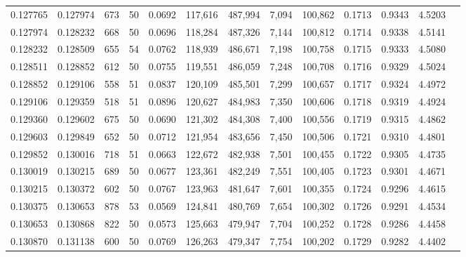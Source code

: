 \begin{tabular}{rrrrrrrrrrrrr}
0.127765 & 0.127974 &   673 &  50 &                                     0.0692 & 117,616 & 487,994 &   7,094 & 100,862 & 0.1713 & 0.9343 & 4.5203 \\
0.127974 & 0.128232 &   668 &  50 &                                     0.0696 & 118,284 & 487,326 &   7,144 & 100,812 & 0.1714 & 0.9338 & 4.5141 \\
0.128232 & 0.128509 &   655 &  54 &                                     0.0762 & 118,939 & 486,671 &   7,198 & 100,758 & 0.1715 & 0.9333 & 4.5080 \\
0.128511 & 0.128852 &   612 &  50 &                                     0.0755 & 119,551 & 486,059 &   7,248 & 100,708 & 0.1716 & 0.9329 & 4.5024 \\
0.128852 & 0.129106 &   558 &  51 &                                     0.0837 & 120,109 & 485,501 &   7,299 & 100,657 & 0.1717 & 0.9324 & 4.4972 \\
0.129106 & 0.129359 &   518 &  51 &                                     0.0896 & 120,627 & 484,983 &   7,350 & 100,606 & 0.1718 & 0.9319 & 4.4924 \\
0.129360 & 0.129602 &   675 &  50 &                                     0.0690 & 121,302 & 484,308 &   7,400 & 100,556 & 0.1719 & 0.9315 & 4.4862 \\
0.129603 & 0.129849 &   652 &  50 &                                     0.0712 & 121,954 & 483,656 &   7,450 & 100,506 & 0.1721 & 0.9310 & 4.4801 \\
0.129852 & 0.130016 &   718 &  51 &                                     0.0663 & 122,672 & 482,938 &   7,501 & 100,455 & 0.1722 & 0.9305 & 4.4735 \\
0.130019 & 0.130215 &   689 &  50 &                                     0.0677 & 123,361 & 482,249 &   7,551 & 100,405 & 0.1723 & 0.9301 & 4.4671 \\
0.130215 & 0.130372 &   602 &  50 &                                     0.0767 & 123,963 & 481,647 &   7,601 & 100,355 & 0.1724 & 0.9296 & 4.4615 \\
0.130375 & 0.130653 &   878 &  53 &                                     0.0569 & 124,841 & 480,769 &   7,654 & 100,302 & 0.1726 & 0.9291 & 4.4534 \\
0.130653 & 0.130868 &   822 &  50 &                                     0.0573 & 125,663 & 479,947 &   7,704 & 100,252 & 0.1728 & 0.9286 & 4.4458 \\
0.130870 & 0.131138 &   600 &  50 &                                     0.0769 & 126,263 & 479,347 &   7,754 & 100,202 & 0.1729 & 0.9282 & 4.4402 \\

\end{tabular}
